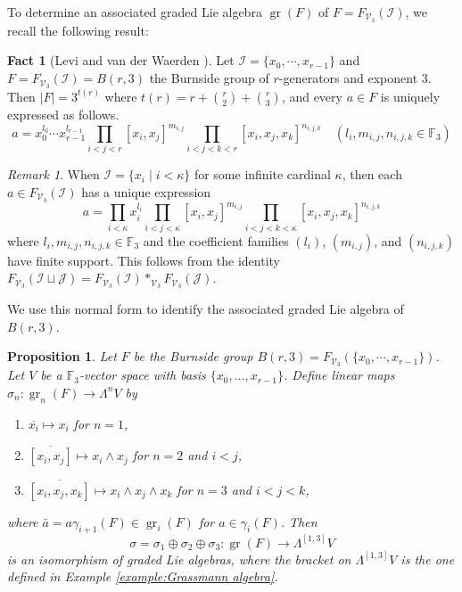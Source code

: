 \documentclass[11pt,reqno]{article}
\newtheorem{proposition}[theorem]{Proposition}
\theoremstyle{definition}
\newtheorem{fact}[theorem]{Fact}
\theoremstyle{remark}
\newtheorem{remark}[theorem]{Remark}
\DeclareMathOperator{\gr}{gr}
\begin{document}
To determine an associated graded Lie algebra $\gr(F)$ of $F=F_{\mathcal V_3}(\mathcal I)$, we recall the following result:
\begin{fact}[Levi and van der Waerden \cite{LeviVanDerWaerden1933}]\label{fact:Levi and van der Waerden}
    Let $\mathcal I=\{x_0,\cdots, x_{r-1}\}$ and $F=F_{\mathcal V_3}(\mathcal I)=B(r,3)$ the Burnside group of $r$-generators and exponent $3$. Then $|F|=3^{t(r)}$ where $t(r)=r + \binom r2 + \binom r3$, and every $a\in F$ is uniquely expressed as follows.
    \[
    a=x_0^{l_0}\cdots x_{r-1}^{l_{r-1}}
    \prod_{i<j<r}[x_i,x_j]^{m_{i,j}}
    \prod_{i<j<k<r}[x_i,x_j,x_k]^{n_{i,j,k}}
    \quad (l_i,m_{i,j},n_{i,j,k}\in\mathbb F_3)
    \]
\end{fact}

\begin{remark}\label{remark:infinite dim}
    When $\mathcal I=\{x_i\mid i< \kappa\}$ for some infinite cardinal $\kappa$, then each $a\in F_{\mathcal V_3}(\mathcal I)$ has a unique expression
    \[
    a=\prod_{i<\kappa} x_i^{l_i}
    \prod_{i<j<\kappa}[x_i,x_j]^{m_{i,j}}
    \prod_{i<j<k<\kappa}[x_i,x_j,x_k]^{n_{i,j,k}}
    \]
    where $l_i,m_{i,j},n_{i,j,k}\in\mathbb F_3$ and the coefficient families
    $(l_i)$, $(m_{i,j})$, and $(n_{i,j,k})$ have finite support.
    This follows from the identity $F_{\mathcal V_3}(\mathcal I\sqcup \mathcal J)=F_{\mathcal V_3}(\mathcal I)*_{\mathcal V_3}F_{\mathcal V_3}(\mathcal J)$.
\end{remark}

We use this normal form to identify the associated graded Lie algebra of
$B(r,3)$.

\begin{proposition}\label{proposition:gr(F) is Grassmann algebra}
    Let $F$ be the Burnside group $B(r,3)=F_{\mathcal V_3}(\{x_0,\cdots, x_{r-1}\})$.
    Let $V$ be a $\mathbb F_3$-vector space with basis
    $\{x_0,\ldots,x_{r-1}\}$.  Define linear maps
    $\sigma_n:\gr_n(F)\to\Lambda^nV$ by
    \begin{enumerate}
        \item $\overline{x_i}\mapsto x_i$ for $n=1$,
        \item $\overline{[x_i,x_j]}\mapsto x_i\wedge x_j$ for $n=2$ and
        $i<j$,
        \item $\overline{[x_i,x_j,x_k]}\mapsto x_i\wedge x_j\wedge x_k$
        for $n=3$ and $i<j<k$,
    \end{enumerate}
    where $\bar a=a\gamma_{i+1}(F)\in \gr_i(F)$ for $a\in\gamma_i(F)$.
    Then
    \[
    \sigma=\sigma_1\oplus\sigma_2\oplus\sigma_3:
    \gr(F)\longrightarrow\Lambda^{[1,3]}V
    \]
    is an isomorphism of graded Lie algebras, where the bracket on
    $\Lambda^{[1,3]}V$ is the one defined in Example \ref{example:Grassmann algebra}.
\end{proposition}
\end{document}
